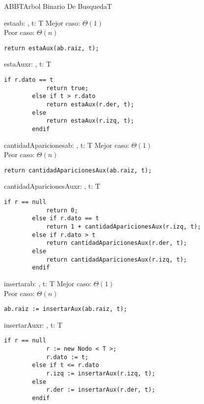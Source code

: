 \begin{module}{ABB}{T}{Arbol Binario De Busqueda}{T}

	\begin{proc}{esta}{\In ab: \moduletype, \In t: T}{\bool}
		Mejor caso: $\Theta(1)$\\
		Peor caso: $\Theta(n)$
		\begin{lstlisting}[numbers=none,frame=none]
		return estaAux(ab.raiz, t);
		\end{lstlisting}
	\end{proc}

	\begin{proc}{estaAux}{\In r: \nodo, \In t: T}{\bool}
		\begin{lstlisting}[numbers=none,frame=none]
		if r.dato == t
			return true;
		else if t > r.dato
			return estaAux(r.der, t);
		else
			return estaAux(r.izq, t);
		endif
		\end{lstlisting}
	\end{proc}

	\begin{proc}{cantidadApariciones}{\In ab: \moduletype, \In t: T}{\Int}
		Mejor caso: $\Theta(1)$ \\
		Peor caso: $\Theta(n)$
		\begin{lstlisting}[numbers=none,frame=none]
		return cantidadAparicionesAux(ab.raiz, t);
		\end{lstlisting}
	\end{proc}

	\begin{proc}{cantidadAparicionesAux}{\In r: \nodo, \In t: T}{\Int}
		\begin{lstlisting}[numbers=none,frame=none]
		if r == null
			return 0;
		else if r.dato == t
			return 1 + cantidadAparicionesAux(r.izq, t);
		else if r.dato > t
			return cantidadAparicionesAux(r.der, t);
		else
			return cantidadAparicionesAux(r.izq, t);
		endif
		\end{lstlisting}
	\end{proc}

	\begin{proc}{insertar}{\Inout ab: \moduletype, \In t: T}{}
		Mejor caso: $\Theta(1)$ \\
		Peor caso: $\Theta(n)$
		\begin{lstlisting}[numbers=none,frame=none]
		ab.raiz := insertarAux(ab.raiz, t);
		\end{lstlisting}
	\end{proc}

	\begin{proc}{insertarAux}{\Inout r: \nodo, \In t: T}{\nodo}
		\begin{lstlisting}[numbers=none,frame=none]
		if r == null
			r := new Nodo < T >;
			r.dato := t;
		else if t <= r.dato
			r.izq := insertarAux(r.izq, t);
		else
			r.der := insertarAux(r.der, t);
		endif


\end{lstlisting}
\end{proc}
\end{module}
